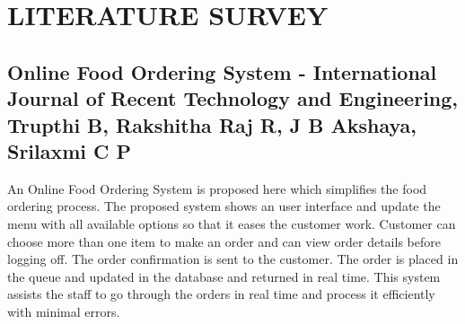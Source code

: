 \documentclass[12pt,a4paper]{report}
\begin{document}
\chapter{LITERATURE SURVEY}
\section{Online Food Ordering System - International Journal of Recent Technology and Engineering, Trupthi B, Rakshitha Raj R, J B Akshaya, Srilaxmi C P }
\hspace{0.25cm}
\par
An Online Food Ordering System is proposed
here which simplifies the food ordering process. The proposed
system shows an user interface and update the menu with all
available options so that it eases the customer work. Customer
can choose more than one item to make an order and can view
order details before logging off. The order confirmation is sent to
the customer. The order is placed in the queue and updated in the
database and returned in real time. This system assists the staff to
go through the orders in real time and process it efficiently with
minimal errors.
\end{document}
